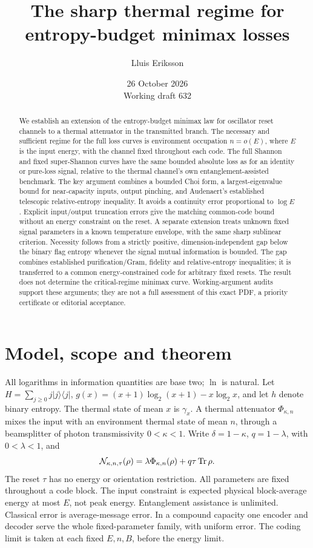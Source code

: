 \documentclass[11pt]{article}
\title{The sharp thermal regime for entropy-budget minimax losses}
\author{Lluis Eriksson}
\date{26 October 2026\\\small Working draft 632}
\newcommand{\Tr}{\operatorname{Tr}}
\newcommand{\PhiT}{\Phi_{\kappa,n}}
\begin{document}
\maketitle
\begin{abstract}
We establish an extension of the entropy-budget minimax law for oscillator
reset channels to a thermal attenuator in the transmitted branch.
The necessary and sufficient regime for the full loss curves is
environment occupation \(n=o(E)\),
where \(E\) is the input energy, with the channel fixed throughout each
code. The full Shannon and fixed super-Shannon curves have
the same bounded absolute loss as for an identity or pure-loss signal,
relative to the thermal channel's own entanglement-assisted benchmark.
The key argument combines a bounded Choi form, a largest-eigenvalue bound
for near-capacity inputs, output pinching, and Audenaert's established
telescopic relative-entropy inequality. It avoids a continuity error
proportional to \(\log E\). Explicit input/output truncation errors give
the matching common-code bound without an energy constraint on the
reset. A separate extension treats unknown fixed signal parameters in
a known temperature envelope, with the same sharp sublinear criterion.
Necessity follows from a strictly positive, dimension-independent gap
below the binary flag entropy whenever the signal mutual information
is bounded. The gap combines established purification/Gram,
fidelity and relative-entropy inequalities; it is transferred to a
common energy-constrained code for arbitrary fixed resets.
The result does not determine the critical-regime minimax curve.
Working-argument audits support these arguments; they are not a full
assessment of this exact PDF, a priority certificate or editorial acceptance.
\end{abstract}

\section{Model, scope and theorem}
All logarithms in information quantities are base two; \(\ln\) is natural.
Let \(H=\sum_{j\ge0}j|j\rangle\langle j|\),
\(g(x)=(x+1)\log_2(x+1)-x\log_2x\), and let \(h\) denote binary entropy.
The thermal state of mean \(x\) is \(\gamma_x\).
A thermal attenuator \(\PhiT\) mixes the input with an environment thermal
state of mean \(n\), through a beamsplitter of photon transmissivity
\(0<\kappa<1\). Write \(\delta=1-\kappa\), \(q=1-\lambda\), with
\(0<\lambda<1\), and
\[
 {\cal N}_{\kappa,n,\tau}(\rho)=\lambda\PhiT(\rho)+q\tau\Tr\rho.
\]
The reset \(\tau\) has no energy or orientation restriction.
All parameters are fixed throughout a code block. The input constraint
is expected physical block-average energy at most \(E\), not peak energy.
Entanglement assistance is unlimited. Classical error is average-message
error. In a compound capacity one encoder and decoder serve the whole
fixed-parameter family, with uniform error. The coding limit is taken
at each fixed \(E,n,B\), before the energy limit.
\end{document}
